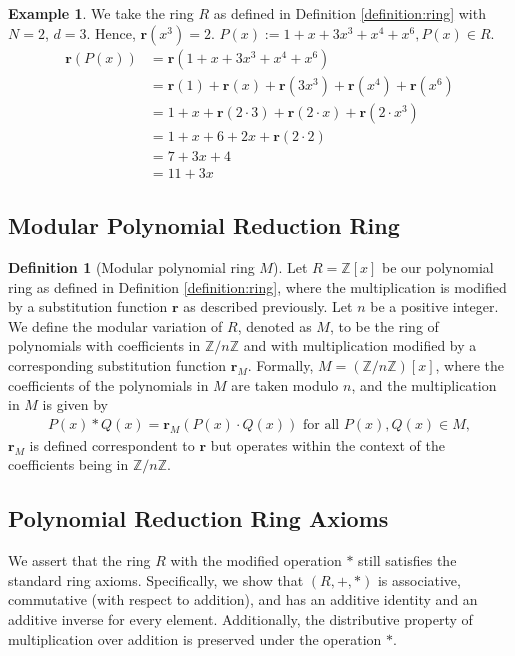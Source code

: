 \documentclass{article}
\theoremstyle{plain}
\theoremstyle{definition}
\newtheorem{definition}{Definition}
\newtheorem{example}{Example}
\newcommand{\redu}{\textbf{r}}
\newcommand{\Z}{\mathbb{Z}}
\newcommand{\Rx}{R}
\newcommand{\Mx}{M}
\begin{document}
\begin{example}
We take the ring $R$ as defined in Definition \ref{definition:ring} with $N = 2$, $d = 3$. Hence, $\redu(x^3) = 2$. $P(x) := 1 + x + 3x^3 + x^{4} + x^{6}, P(x) \in R$.
\begin{align}
    \redu(P(x)) &= \redu(1 + x + 3x^3 + x^{4} + x^{6}) \\
    &= \redu(1) + \redu(x) + \redu(3x^3) + \redu(x^{4}) + \redu(x^{6}) \\
    &= 1 + x + \redu(2 \cdot 3) + \redu(2 \cdot x) + \redu(2 \cdot x^3) \\
    &= 1 + x + 6 + 2x + \redu(2 \cdot 2) \\
    &= 7 + 3x + 4 \\
    &= 11 + 3x
\end{align}
\end{example}

\subsection{Modular Polynomial Reduction Ring}
\begin{definition}[Modular polynomial ring $\Mx$]  \label{definition:modularring}
Let \( \Rx = \Z[x] \) be our polynomial ring as defined in Definition \ref{definition:ring}, where the multiplication is modified by a substitution function \(\redu\) as described previously. Let \( n \) be a positive integer. We define the modular variation of \( \Rx \), denoted as \( \Mx \), to be the ring of polynomials with coefficients in \( \Z/n\Z \) and with multiplication modified by a corresponding substitution function \(\redu_M\). Formally, \( \Mx = (\Z/n\Z)[x] \), where the coefficients of the polynomials in \( \Mx \) are taken modulo \( n \), and the multiplication in \( \Mx \) is given by
\begin{align}
    P(x) \ast Q(x) = \redu_M(P(x) \cdot Q(x)) \text{ for all } P(x), Q(x) \in \Mx,
\end{align}
\(\redu_M\) is defined correspondent to \(\redu\) but operates within the context of the coefficients being in \( \Z/n\Z \).
\end{definition}

\subsection{Polynomial Reduction Ring Axioms}
We assert that the ring \( \Rx \) with the modified operation \(\ast\) still satisfies the standard ring axioms. Specifically, we show that \((R, +, \ast)\) is associative, commutative (with respect to addition), and has an additive identity and an additive inverse for every element. Additionally, the distributive property of multiplication over addition is preserved under the operation \(\ast\).
\end{document}
